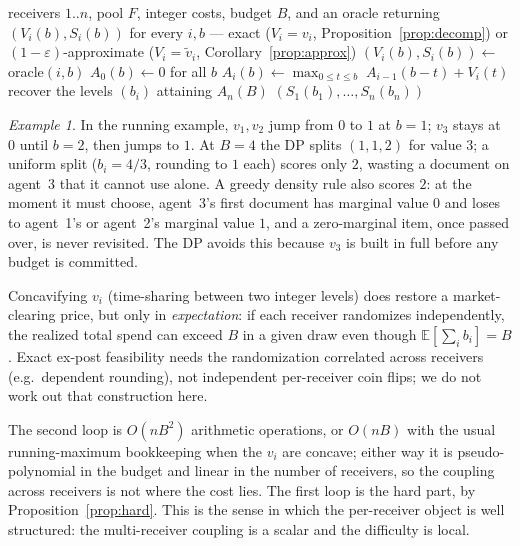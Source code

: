 \documentclass[sigconf,anonymous]{aamas}
\theoremstyle{remark}
\newtheorem{example}{Example}
\begin{document}
\begin{algorithm}[t]
\caption{Marginal allocation, given any per-receiver oracle}
\label{alg:dp}
\begin{algorithmic}[1]
\Require receivers $1..n$, pool $F$, integer costs, budget $B$, and an
  oracle returning $(V_i(b), S_i(b))$ for every $i,b$ --- exact
  ($V_i{=}v_i$, Proposition~\ref{prop:decomp}) or
  $(1-\varepsilon)$-approximate ($V_i{=}\widetilde{v}_i$,
  Corollary~\ref{prop:approx})
    \State $(V_i(b), S_i(b)) \gets$ oracle$(i, b)$
  \EndFor
\EndFor
\State $A_0(b) \gets 0$ for all $b$
  \State $A_i(b) \gets \max_{0 \le t \le b}\; A_{i-1}(b-t) + V_i(t)$
\EndFor
\State recover the levels $(b_i)$ attaining $A_n(B)$
\Return $(S_1(b_1),\dots,S_n(b_n))$
\end{algorithmic}
\end{algorithm}

\begin{example}
\label{ex:dp}
In the running example, $v_1,v_2$ jump from $0$ to $1$ at $b=1$; $v_3$
stays at $0$ until $b=2$, then jumps to $1$. At $B=4$ the DP splits
$(1,1,2)$ for value $3$; a uniform split ($b_i=4/3$, rounding to $1$
each) scores only $2$, wasting a document on agent~3 that it cannot
use alone. A greedy density rule also scores $2$: at the moment it
must choose, agent~3's first document has marginal value $0$ and loses
to agent~1's or agent~2's marginal value $1$, and a zero-marginal item,
once passed over, is never revisited. The DP avoids this because
$v_3$ is built in full before any budget is committed.
\end{example}

Concavifying $v_i$ (time-sharing between two integer levels) does
restore a market-clearing price, but only in \emph{expectation}: if
each receiver randomizes independently, the realized total spend can
exceed $B$ in a given draw even though $\mathbb{E}[\sum_i b_i]=B$.
Exact ex-post feasibility needs the randomization correlated across
receivers (e.g.\ dependent rounding), not independent per-receiver
coin flips; we do not work out that construction here.

The second loop is $O(nB^2)$ arithmetic operations, or $O(nB)$ with the
usual running-maximum bookkeeping when the $v_i$ are concave; either
way it is pseudo-polynomial in the budget and linear in the number of
receivers, so the coupling across receivers is not where the cost
lies. The first loop is the hard part, by
Proposition~\ref{prop:hard}. This is the sense in which the
per-receiver object is well structured: the multi-receiver coupling is
a scalar and the difficulty is local.
\end{document}
